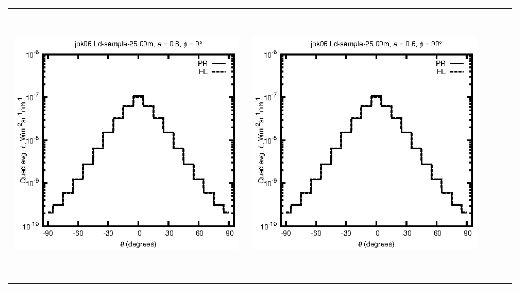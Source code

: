 \documentclass[10pt,a4paper]{article}
\begin{document}
\begin{adjustwidth}{-1.2in}{-1.2in}
\begin{tabular}{c c c c}
\includegraphics[height=7cm]{../eps/jok06_Ld_sample_25.00m_fwd.eps} &
\includegraphics[height=7cm]{../eps/jok06_Ld_sample_25.00m_cross.eps} \\
\end{tabular}

\pagebreak


\end{adjustwidth}
\end{document}
